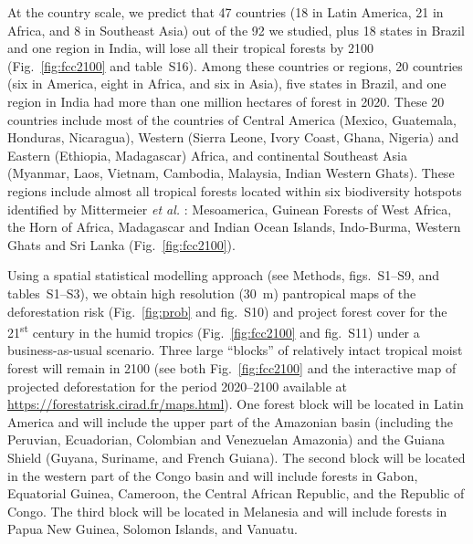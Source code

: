 \documentclass[
  12pt,
]{article}
\begin{document}
At the country scale, we predict that 47 countries (18 in Latin America, 21 in Africa, and 8 in Southeast Asia) out of the 92 we studied, plus 18 states in Brazil and one region in India, will lose all their tropical forests by 2100 (Fig.~\ref{fig:fcc2100} and table~S16). Among these countries or regions, 20 countries (six in America, eight in Africa, and six in Asia), five states in Brazil, and one region in India had more than one million hectares of forest in 2020. These 20 countries include most of the countries of Central America (Mexico, Guatemala, Honduras, Nicaragua), Western (Sierra Leone, Ivory Coast, Ghana, Nigeria) and Eastern (Ethiopia, Madagascar) Africa, and continental Southeast Asia (Myanmar, Laos, Vietnam, Cambodia, Malaysia, Indian Western Ghats). These regions include almost all tropical forests located within six biodiversity hotspots identified by Mittermeier \emph{et al.} \citep{Mittermeier2011}: Mesoamerica, Guinean Forests of West Africa, the Horn of Africa, Madagascar and Indian Ocean Islands, Indo-Burma, Western Ghats and Sri Lanka (Fig.~\ref{fig:fcc2100}).\\

\newpage

Using a spatial statistical modelling approach (see Methods, figs.~S1--S9, and tables~S1--S3), we obtain high resolution (30~m) pantropical maps of the deforestation risk (Fig.~\ref{fig:prob} and fig.~S10) and project forest cover for the 21\textsuperscript{st} century in the humid tropics (Fig.~\ref{fig:fcc2100} and fig.~S11) under a business-as-usual scenario. Three large ``blocks'' of relatively intact tropical moist forest will remain in 2100 (see both Fig.~\ref{fig:fcc2100} and the interactive map of projected deforestation for the period 2020--2100 available at \url{https://forestatrisk.cirad.fr/maps.html}). One forest block will be located in Latin America and will include the upper part of the Amazonian basin (including the Peruvian, Ecuadorian, Colombian and Venezuelan Amazonia) and the Guiana Shield (Guyana, Suriname, and French Guiana). The second block will be located in the western part of the Congo basin and will include forests in Gabon, Equatorial Guinea, Cameroon, the Central African Republic, and the Republic of Congo. The third block will be located in Melanesia and will include forests in Papua New Guinea, Solomon Islands, and Vanuatu.\\
\end{document}
